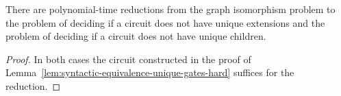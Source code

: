 \documentclass[../paper.tex]{subfiles}
\begin{document}
\begin{lem}
  There are polynomial-time reductions from the graph isomorphism problem to
  the problem of deciding if a circuit does not have unique extensions and the
  problem of deciding if a circuit does not have unique children.
  \label{lem:unique-extensions-hard}
\end{lem}
\begin{proof}
  In both cases the circuit constructed in the proof of
  Lemma~\ref{lem:syntactic-equivalence-unique-gates-hard} suffices for the
  reduction.
\end{proof}



\end{document}
